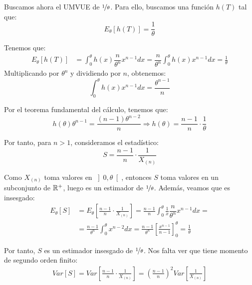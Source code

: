 \begin{ejemplo}
    Buscamos ahora el UMVUE de $\nicefrac{1}{\theta}$. Para ello, buscamos una función $h(T)$ tal que:
    \begin{equation*}
        E_\theta[h(T)] = \frac{1}{\theta}
    \end{equation*}

    Tenemos que:
    \begin{align*}
        E_\theta[h(T)] &= \int_0^\theta h(x) \dfrac{n}{\theta^n} x^{n-1} dx = \dfrac{n}{\theta^n} \int_0^\theta h(x) x^{n-1} dx = \frac{1}{\theta}
    \end{align*}
    Multiplicando por $\theta^n$ y dividiendo por $n$, obtenemos:
    \begin{equation*}
        \int_0^\theta h(x) x^{n-1} dx = \frac{\theta^{n-1}}{n}
    \end{equation*}
    
    Por el teorema fundamental del cálculo, tenemos que:
    \begin{equation*}
        h(\theta) \theta^{n-1} = \frac{(n-1)\theta^{n-2}}{n} \Longrightarrow h(\theta) = \frac{n-1}{n} \cdot \frac{1}{\theta}
    \end{equation*}

    Por tanto, para $n>1$, consideramos el estadístico:
    \begin{equation*}
        S = \frac{n-1}{n} \cdot \frac{1}{X_{(n)}}
    \end{equation*}

    Como $X_{(n)}$ toma valores en $\left]0, \theta\right[$, entonces $S$ toma valores en un subconjunto de $\mathbb{R}^+$, luego es un estimador de $\nicefrac{1}{\theta}$. Además, veamos que es insesgado:
    \begin{align*}
        E_\theta[S] &= E_\theta\left[\frac{n-1}{n} \cdot \frac{1}{X_{(n)}}\right] = \frac{n-1}{n} \int_0^\theta \frac{1}{x} \dfrac{n}{\theta^n} x^{n-1} dx =\\&= \frac{n-1}{\theta^n} \int_0^\theta x^{n-2} dx = \frac{n-1}{\theta^n} \left[\frac{x^{n-1}}{n-1}\right]_0^\theta = \frac{1}{\theta}
    \end{align*}

    Por tanto, $S$ es un estimador insesgado de $\nicefrac{1}{\theta}$. Nos falta ver que tiene momento de segundo orden finito:
    \begin{align*}
        Var[S] = Var\left[\frac{n-1}{n} \cdot \frac{1}{X_{(n)}}\right] = \left(\frac{n-1}{n}\right)^2 Var\left[\frac{1}{X_{(n)}}\right]
    \end{align*}


\end{ejemplo}
